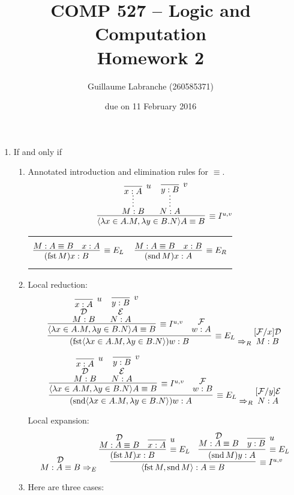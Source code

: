 \documentclass{article}
\author{Guillaume Labranche (260585371)}
\title{COMP 527 -- Logic and Computation\\Homework 2}
\date{due on 11 February 2016}
\DeclareMathOperator{\fst}{fst}
\DeclareMathOperator{\snd}{snd}
\renewcommand{\t}{\text{}}
\begin{document}
\maketitle

\begin{enumerate}[label=\textbf{Exercise \arabic*}]


\item If and only if

\begin{enumerate}[label=\textbf{Task \arabic*},leftmargin=1em]
\item Annotated introduction and elimination rules for $\equiv$.
\[
\infer[\equiv I^{u,v}]
  {\langle \lambda x \in A.M,\lambda y \in B.N \rangle A \equiv B \t}
  {\infer*{M:B\t}{\infer[u]{x:A\t}{}} & \infer*{N:A\t}{\infer[v]{y:B\t}{}}}
\]
\begin{tabular}{cc}
$$
\infer[\equiv E_L]
  {(\fst M) x : B \t}
  {M:A \equiv B \t & x : A \t}
$$
&
$$
\infer[\equiv E_R]
  {(\snd M) x : A \t}
  {M:A \equiv B \t & x : B \t}
$$
\end{tabular}

\item Local reduction: %
\[
\infer[\equiv E_L]
  { (\fst \langle \lambda x \in A.M,\lambda y \in B.N \rangle) w : B \t}
  {\infer[\equiv I^{u,v}]
    {\langle \lambda x \in A.M,\lambda y \in B.N \rangle A \equiv B \t}
    {\deduce[\mathcal{D}]{M:B\t}{\infer[u]{x:A\t}{}}
     & \deduce[\mathcal{E}]{N:A\t}{\infer[v]{y:B\t}{}}
     }
  & \deduce[\mathcal{F}]{w:A \t}{}
  }
\Rightarrow_R
\deduce[{[}\mathcal{F}/x{]}\mathcal{D}]
  {M:B \t}
  {}
\]

\[
\infer[\equiv E_L]
  { (\snd \langle \lambda x \in A.M,\lambda y \in B.N \rangle) w : A \t}
  {\infer[\equiv I^{u,v}]
    {\langle \lambda x \in A.M,\lambda y \in B.N \rangle A \equiv B \t}
    {\deduce[\mathcal{D}]{M:B\t}{\infer[u]{x:A\t}{}}
     & \deduce[\mathcal{E}]{N:A\t}{\infer[v]{y:B\t}{}}
     }
  & \deduce[\mathcal{F}]{w:B \t}{}
  }
\Rightarrow_R
\deduce[{[}\mathcal{F}/y{]}\mathcal{E}]
  {N:A \t}
  {}
\]

Local expansion: %
\[
\deduce[\mathcal{D}]{M : A \equiv B \t}{}
\Rightarrow_E
\infer[\equiv I^{u,v}]
  {\langle \fst M, \snd M \rangle : A \equiv B \t}
  {\infer[\equiv E_L]
    {(\fst M)x : B \t}
    {\deduce[\mathcal{D}]{M : A \equiv B \t}{}
    & \infer[u]{x:A \t}{}}
  &\infer[\equiv E_L]
    {(\snd M)y : A \t}
    {\deduce[\mathcal{D}]{M : A \equiv B \t}{}
    & \infer[u]{y:B \t}{}}
  }
\]

\item Here are three cases:


\end{enumerate}
\end{enumerate}
\end{document}
